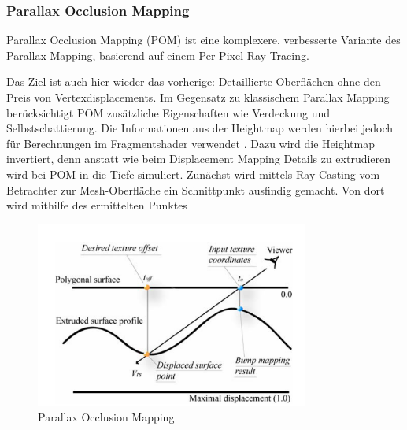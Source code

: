 \subsubsection{Parallax Occlusion Mapping}

Parallax Occlusion Mapping (POM) ist eine komplexere, verbesserte Variante des Parallax Mapping, basierend auf einem Per-Pixel Ray Tracing.

Das Ziel ist auch hier wieder das vorherige: Detaillierte Oberflächen ohne den Preis von Vertexdisplacements. 
Im Gegensatz zu klassischem Parallax Mapping berücksichtigt POM zusätzliche Eigenschaften wie Verdeckung und 
Selbstschattierung. 
Die Informationen aus der Heightmap werden hierbei jedoch für Berechnungen 
im Fragmentshader verwendet \parencite{Tatarchuk2006}. Dazu wird die Heightmap invertiert, denn anstatt
wie beim Displacement Mapping Details zu extrudieren wird bei POM in die Tiefe simuliert.  
Zunächst wird mittels Ray Casting vom Betrachter zur Mesh-Oberfläche ein Schnittpunkt ausfindig gemacht. 
Von dort wird mithilfe des ermittelten Punktes  

\begin{figure}[h]
    \centering
	\includegraphics[width=0.8\textwidth]{Grafiken/POM.png}
	\begin{footnotesize}
		\caption{Parallax Occlusion Mapping}
	\end{footnotesize}
\end{figure}




